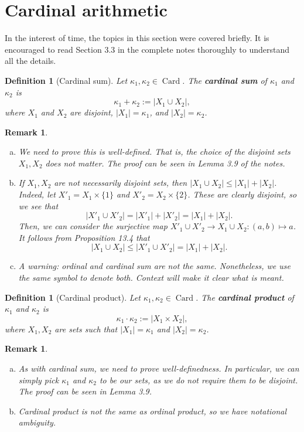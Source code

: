 \documentclass[10pt]{article}
\DeclareMathOperator{\Card}{Card}
\theoremstyle{newstyle}
\newtheorem{remark}[thm]{Remark}
\newtheorem{defn}[thm]{Definition}
\begin{document}
 
\newpage\section{Cardinal arithmetic}

In the interest of time, the topics in this section were covered briefly. 
It is encouraged to read Section 3.3 in the complete notes thoroughly to understand all the details.

\begin{defn}[Cardinal sum] 
Let $\kappa_1, \kappa_2 \in \Card$. The {\bf cardinal sum} of $\kappa_1$ and $\kappa_2$ is 
\[ \kappa_1 + \kappa_2 := |X_1 \cup X_2|, \] 
where $X_1$ and $X_2$ are disjoint, $|X_1| = \kappa_1$, and $|X_2| = \kappa_2$. 
\end{defn}

\begin{remark}~
\begin{enumerate}[(a)]
    \item We need to prove this is well-defined. That is, the choice of the disjoint 
    sets $X_1, X_2$ does not matter. The proof can be seen in Lemma 3.9 of the notes.
    \item If $X_1, X_2$ are not necessarily disjoint sets, then $|X_1 \cup X_2| \leq 
    |X_1| + |X_2|$. Indeed, let $X'_1 = X_1 \times \{1\}$ and $X'_2 = X_2 \times \{2\}$. 
    These are clearly disjoint, so we see that 
    \[ |X'_1 \cup X'_2| = |X'_1| + |X'_2| = |X_1| + |X_2|. \] 
    Then, we can consider the surjective map $X'_1 \cup X'_2 \to X_1 \cup X_2 : (a, b) \mapsto a$. 
    It follows from Proposition 13.4 that 
    \[ |X_1 \cup X_2| \leq |X'_1 \cup X'_2| = |X_1| + |X_2|. \]
    \item A warning: ordinal and cardinal sum are not the same. Nonetheless, we use the 
    same symbol to denote both. Context will make it clear what is meant.
\end{enumerate} 
\end{remark}

\begin{defn}[Cardinal product] 
Let $\kappa_1, \kappa_2 \in \Card$. The {\bf cardinal product} of $\kappa_1$ and $\kappa_2$ 
is 
\[ \kappa_1 \cdot \kappa_2 := |X_1 \times X_2|, \] 
where $X_1, X_2$ are sets such that $|X_1| = \kappa_1$ and $|X_2| = \kappa_2$. 
\end{defn}

\begin{remark}~
\begin{enumerate}[(a)]
    \item As with cardinal sum, we need to prove well-definedness. In particular, 
    we can simply pick $\kappa_1$ and $\kappa_2$ to be our sets, as we do not require 
    them to be disjoint. The proof can be seen in Lemma 3.9. 
    \item Cardinal product is not the same as ordinal product, so we have notational ambiguity.
\end{enumerate}
\end{remark}
\end{document}
